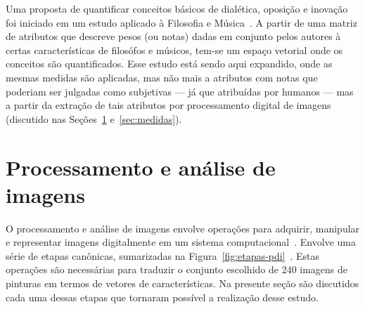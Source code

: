 Uma proposta de quantificar conceitos básicos de dialética, oposição e
inovação foi iniciado em um estudo aplicado à Filosofia e
Música~\cite{vieira}. A partir de uma matriz de atributos que descreve
pesos (ou notas) dadas em conjunto pelos autores à certas
características de filosófos e músicos, tem-se um espaço vetorial onde
os conceitos são quantificados. Esse estudo está sendo aqui expandido,
onde as mesmas medidas são aplicadas, mas não mais a atributos com
notas que poderiam ser julgadas como subjetivas --- já que atribuídas
por humanos --- mas a partir da extração de tais atributos por
processamento digital de imagens (discutido nas
Seções~\ref{sec:fund:imagens} e~\ref{sec:medidas}).

\section{Processamento e análise de imagens}
\label{sec:fund:imagens}

O processamento e análise de imagens envolve operações para adquirir,
manipular e representar imagens digitalmente em um sistema
computacional~\cite{gonzalez}. Envolve uma série de etapas canônicas,
sumarizadas na Figura~\ref{fig:etapas-pdi}~\cite{luciano}. Estas
operações são necessárias para traduzir o conjunto escolhido de 240
imagens de pinturas em termos de vetores de características. Na
presente seção são discutidos cada uma dessas etapas que tornaram
possível a realização desse estudo.

